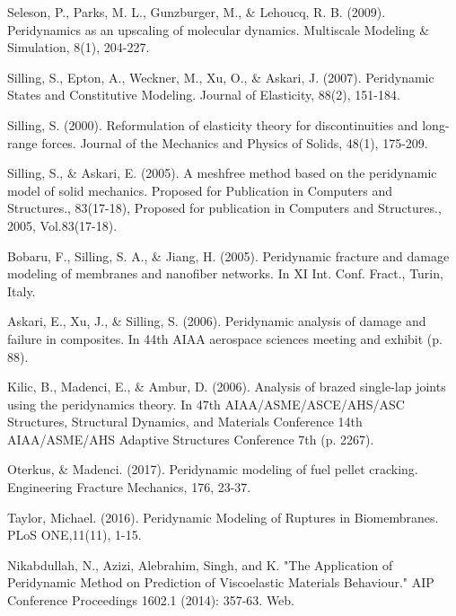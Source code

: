 \begin{thebibliography}{}
%
%

Seleson, P., Parks, M. L., Gunzburger, M., \& Lehoucq, R. B. (2009). Peridynamics as an upscaling of molecular dynamics. Multiscale Modeling \& Simulation, 8(1), 204-227.

Silling, S., Epton, A., Weckner, M., Xu, O., \& Askari, J. (2007). Peridynamic States and Constitutive Modeling. Journal of Elasticity, 88(2), 151-184.

Silling, S. (2000). Reformulation of elasticity theory for discontinuities and long-range forces. Journal of the Mechanics and Physics of Solids, 48(1), 175-209.

Silling, S., \& Askari, E. (2005). A meshfree method based on the peridynamic model of solid mechanics. Proposed for Publication in Computers and Structures., 83(17-18), Proposed for publication in Computers and Structures., 2005, Vol.83(17-18).

Bobaru, F., Silling, S. A., \& Jiang, H. (2005). Peridynamic fracture and damage modeling of membranes and nanofiber networks. In XI Int. Conf. Fract., Turin, Italy.

Askari, E., Xu, J., \& Silling, S. (2006). Peridynamic analysis of damage and failure in composites. In 44th AIAA aerospace sciences meeting and exhibit (p. 88).

Kilic, B., Madenci, E., \& Ambur, D. (2006). Analysis of brazed single-lap joints using the peridynamics theory. In 47th AIAA/ASME/ASCE/AHS/ASC Structures, Structural Dynamics, and Materials Conference 14th AIAA/ASME/AHS Adaptive Structures Conference 7th (p. 2267).

Oterkus, \& Madenci. (2017). Peridynamic modeling of fuel pellet cracking. Engineering Fracture Mechanics, 176, 23-37.

Taylor, Michael. (2016). Peridynamic Modeling of Ruptures in Biomembranes. PLoS ONE,11(11), 1-15.

Nikabdullah, N., Azizi, Alebrahim, Singh, and K. "The Application of Peridynamic Method on Prediction of Viscoelastic Materials Behaviour." AIP Conference Proceedings 1602.1 (2014): 357-63. Web.


\end{thebibliography}
